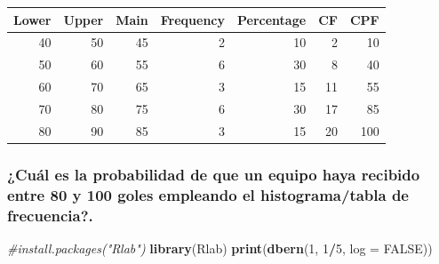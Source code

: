 \documentclass[]{article}
\newenvironment{Shaded}{\begin{snugshade}}{\end{snugshade}}
\newcommand{\CommentTok}[1]{\textcolor[rgb]{0.56,0.35,0.01}{\textit{#1}}}
\newcommand{\DataTypeTok}[1]{\textcolor[rgb]{0.13,0.29,0.53}{#1}}
\newcommand{\DecValTok}[1]{\textcolor[rgb]{0.00,0.00,0.81}{#1}}
\newcommand{\KeywordTok}[1]{\textcolor[rgb]{0.13,0.29,0.53}{\textbf{#1}}}
\newcommand{\NormalTok}[1]{#1}
\newcommand{\OperatorTok}[1]{\textcolor[rgb]{0.81,0.36,0.00}{\textbf{#1}}}
\newcommand{\OtherTok}[1]{\textcolor[rgb]{0.56,0.35,0.01}{#1}}
\newcommand{\StringTok}[1]{\textcolor[rgb]{0.31,0.60,0.02}{#1}}
\begin{document}
\begin{Shaded}
\end{Shaded}

\begin{table}[H]
\centering
\begin{tabular}{r|r|r|r|r|r|r}
\hline
Lower & Upper & Main & Frequency & Percentage & CF & CPF\\
\hline
\rowcolor{gray!6}  40 & 50 & 45 & 2 & 10 & 2 & 10\\
\hline
50 & 60 & 55 & 6 & 30 & 8 & 40\\
\hline
\rowcolor{gray!6}  60 & 70 & 65 & 3 & 15 & 11 & 55\\
\hline
70 & 80 & 75 & 6 & 30 & 17 & 85\\
\hline
\rowcolor{gray!6}  80 & 90 & 85 & 3 & 15 & 20 & 100\\
\hline
\end{tabular}
\end{table}

\hypertarget{cual-es-la-probabilidad-de-que-un-equipo-haya-recibido-entre-80-y-100-goles-empleando-el-histogramatabla-de-frecuencia.}{%
\subsubsection{¿Cuál es la probabilidad de que un equipo haya recibido
entre 80 y 100 goles empleando el histograma/tabla de
frecuencia?.}\label{cual-es-la-probabilidad-de-que-un-equipo-haya-recibido-entre-80-y-100-goles-empleando-el-histogramatabla-de-frecuencia.}}

\begin{Shaded}
\begin{Highlighting}[]
\CommentTok{#install.packages("Rlab")}
\KeywordTok{library}\NormalTok{(Rlab)}
\KeywordTok{print}\NormalTok{(}\KeywordTok{dbern}\NormalTok{(}\DecValTok{1}\NormalTok{, }\DecValTok{1}\OperatorTok{/}\DecValTok{5}\NormalTok{, }\DataTypeTok{log =} \OtherTok{FALSE}\NormalTok{))}
\end{Highlighting}
\end{Shaded}
\end{document}
